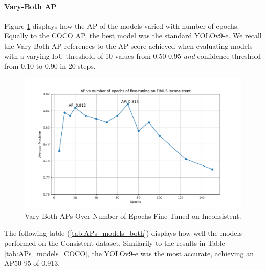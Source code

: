 \paragraph{Vary-Both AP}
Figure \ref{fig:plot_AP_both} displays how the AP of the models varied with number of epochs. Equally to the COCO AP, the best model was the standard YOLOv9-e. We recall the Vary-Both AP references to the AP score achieved when evaluating models with a varying IoU threshold of 10 values from 0.50-0.95 \textit{and} confidence threshold from 0.10 to 0.90 in 20 steps.   

\begin{figure}[H]
    \centering
    \includegraphics[width=\textwidth]{Images/Analytics/plot_AP_both.png}
    \caption{Vary-Both APs Over Number of Epochs Fine Tuned on Inconsistent.}
    \label{fig:plot_AP_both}
\end{figure}

The following table (\ref{tab:APs_models_both}) displays how well the models performed on the Consistent dataset. Similarily to the results in Table \ref{tab:APs_models_COCO}, the YOLOv9-e was the most accurate, achieving an AP50-95 of 0.913. 

